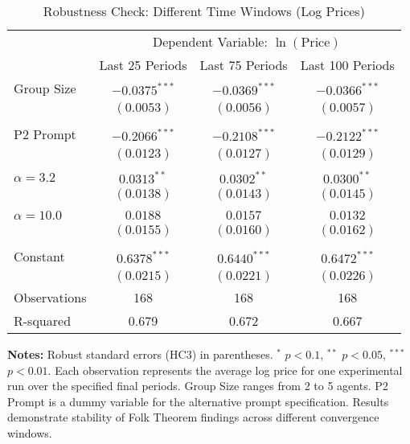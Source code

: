 \begin{table}[H]
    \centering
    \caption{Robustness Check: Different Time Windows (Log Prices)}
    \label{tab:robustness_time_windows}
    \begin{threeparttable}
    \begin{tabular}{lccc}
    \toprule
     & \multicolumn{3}{c}{Dependent Variable: $\ln(\text{Price})$} \\
    \cmidrule(lr){2-4}
     & Last 25 Periods & Last 75 Periods & Last 100 Periods \\
    \midrule
    Group Size & $-0.0375^{***}$ & $-0.0369^{***}$ & $-0.0366^{***}$ \\
     & $(0.0053)$ & $(0.0056)$ & $(0.0057)$ \\
    \\
    P2 Prompt & $-0.2066^{***}$ & $-0.2108^{***}$ & $-0.2122^{***}$ \\
     & $(0.0123)$ & $(0.0127)$ & $(0.0129)$ \\
    \\
    $\alpha = 3.2$ & $0.0313^{**}$ & $0.0302^{**}$ & $0.0300^{**}$ \\
     & $(0.0138)$ & $(0.0143)$ & $(0.0145)$ \\
    \\
    $\alpha = 10.0$ & $0.0188$ & $0.0157$ & $0.0132$ \\
     & $(0.0155)$ & $(0.0160)$ & $(0.0162)$ \\
    \\
    Constant & $0.6378^{***}$ & $0.6440^{***}$ & $0.6472^{***}$ \\
     & $(0.0215)$ & $(0.0221)$ & $(0.0226)$ \\
    \midrule
    Observations & 168 & 168 & 168 \\
    R-squared & 0.679 & 0.672 & 0.667 \\
    \bottomrule
    \end{tabular}
    \begin{tablenotes}[flushleft]
    \footnotesize
    \item \textbf{Notes:} Robust standard errors (HC3) in parentheses. $^{*}$ $p<0.1$, $^{**}$ $p<0.05$, $^{***}$ $p<0.01$. Each observation represents the average log price for one experimental run over the specified final periods. Group Size ranges from 2 to 5 agents. P2 Prompt is a dummy variable for the alternative prompt specification. Results demonstrate stability of Folk Theorem findings across different convergence windows.
    \end{tablenotes}
    \end{threeparttable}
\end{table}

